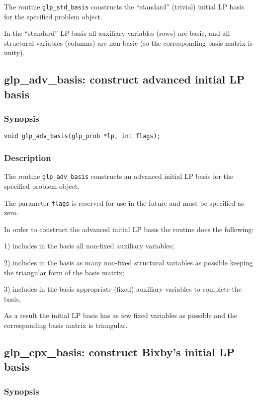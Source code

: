 The routine \verb|glp_std_basis| constructs the ``standard'' (trivial)
initial LP basis for the specified problem object.

In the ``standard'' LP basis all auxiliary variables (rows) are basic,
and all structural variables (columns) are non-basic (so the
corresponding basis matrix is unity).

\newpage

\subsection{glp\_adv\_basis: construct advanced initial LP basis}

\subsubsection*{Synopsis}

\begin{verbatim}
void glp_adv_basis(glp_prob *lp, int flags);
\end{verbatim}

\subsubsection*{Description}

The routine \verb|glp_adv_basis| constructs an advanced initial LP
basis for the specified problem object.

The parameter \verb|flags| is reserved for use in the future and must
be specified as zero.

In order to construct the advanced initial LP basis the routine does
the following:

1) includes in the basis all non-fixed auxiliary variables;

2) includes in the basis as many non-fixed structural variables as
possible keeping the triangular form of the basis matrix;

3) includes in the basis appropriate (fixed) auxiliary variables to
complete the basis.

As a result the initial LP basis has as few fixed variables as possible
and the corresponding basis matrix is triangular.

\subsection{glp\_cpx\_basis: construct Bixby's initial LP basis}

\subsubsection*{Synopsis}


